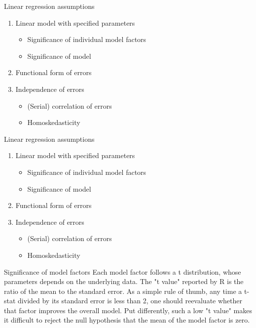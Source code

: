 \documentclass[xcolor=dvipsnames]{beamer}\usepackage{graphicx, color}
\begin{document}
\begin{frame}[fragile]{Linear regression assumptions}
  \begin{enumerate}
    \item Linear model with specified parameters
      \begin{itemize}
        \item Significance of individual model factors
        \item Significance of model
      \end{itemize}
    \item Functional form of errors
    \item Independence of errors
      \begin{itemize}
        \item (Serial) correlation of errors
        \item Homoskedasticity
      \end{itemize}
  \end{enumerate}
\end{frame}

\begin{frame}[fragile]{Linear regression assumptions}
  \begin{enumerate}
    \item Linear model with specified parameters
      \begin{itemize}
        \item \color{blue} Significance of individual model factors
        \item Significance of model
      \end{itemize}
    \item Functional form of errors
    \item Independence of errors
      \begin{itemize}
        \item (Serial) correlation of errors
        \item Homoskedasticity
      \end{itemize}
  \end{enumerate}
\end{frame}

\begin{frame}[fragile]{Significance of model factors}
  Each model factor follows a t distribution, whose parameters depends on the underlying data. The "t value" reported by R is the ratio of the mean to the standard error. As a simple rule of thumb, any time a t-stat divided by its standard error is less than 2, one should reevaluate whether that factor improves the overall model. Put differently, such a low "t value" makes it difficult to reject the null hypothesis that the mean of the model factor is zero.
\end{frame}
\end{document}
